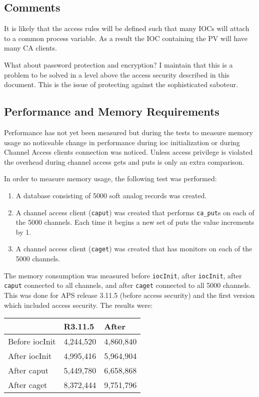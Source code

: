 \subsection{Comments}

It is likely that the access rules will be defined such that many IOCs will attach to a common process variable. As a result 
the IOC containing the PV will have many CA clients.

What about password protection and encryption? I maintain that this is a problem to be solved in a level above the access 
security described in this document. This is the issue of protecting against the sophisticated saboteur.

\subsection{Performance and Memory Requirements}

Performance has not yet been measured but during the tests to measure memory usage no noticeable change in 
performance during ioc initialization or during Channel Access clients connection was noticed. Unless access privilege is 
violated the overhead during channel access gets and puts is only an extra comparison.

In order to measure memory usage, the following test was performed:

\begin{enumerate}\item A database consisting of 5000 soft analog records was created.

\item A channel access client (\verb|caput|) was created that performs \verb|ca_put|s on each of the 5000 channels. Each time it 
begins a new set of puts the value increments by 1.

\item A channel access client (\verb|caget|) was created that has monitors on each of the 5000 channels.

\end{enumerate}The memory consumption was measured before \verb|iocInit|, after \verb|iocInit|, after \verb|caput| connected to all channels, and 
after \verb|caget| connected to all 5000 channels. This was done for APS release 3.11.5 (before access security) and the first 
version which included access security. The results were:
\begin{center}\begin{longtable}{p{1.0in}p{1.0in}p{1.0in}}
\textbf{} & \textbf{R3.11.5} & \textbf{After}\\
\hline
Before iocInit & 4,244,520 & 4,860,840\\
After iocInit & 4,995,416 & 5,964,904\\
After caput & 5,449,780 & 6,658,868\\
After caget & 8,372,444 & 9,751,796
\end{longtable}\end{center}


